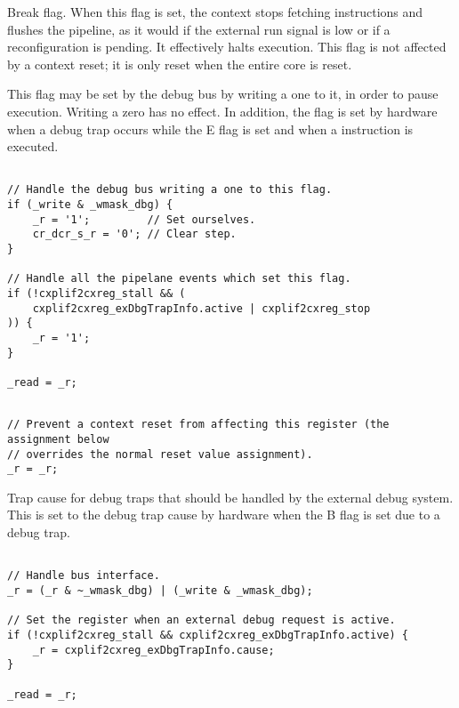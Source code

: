 Break flag. When this flag is set, the context stops fetching instructions and
flushes the pipeline, as it would if the external run signal is low or if a
reconfiguration is pending. It effectively halts execution. This flag is not 
affected by a context reset; it is only reset when the entire core is reset.

This flag may be set by the debug bus by writing a one to it, in order to pause
execution. Writing a zero has no effect. In addition, the flag is set by
hardware when a debug trap occurs while the E flag is set and when a 
instruction is executed.

\declaration{}
\implementation{}
\begin{lstlisting}

// Handle the debug bus writing a one to this flag.
if (_write & _wmask_dbg) {
    _r = '1';         // Set ourselves.
    cr_dcr_s_r = '0'; // Clear step.
}

// Handle all the pipelane events which set this flag.
if (!cxplif2cxreg_stall && (
    cxplif2cxreg_exDbgTrapInfo.active | cxplif2cxreg_stop
)) {
    _r = '1';
}

_read = _r;
\end{lstlisting}
\resetImplementation{}
\begin{lstlisting}

// Prevent a context reset from affecting this register (the assignment below
// overrides the normal reset value assignment).
_r = _r;

\end{lstlisting}

Trap cause for debug traps that should be handled by the external debug system.
This is set to the debug trap cause by hardware when the B flag is set due to a
debug trap.

\declaration{}
\implementation{}
\begin{lstlisting}

// Handle bus interface.
_r = (_r & ~_wmask_dbg) | (_write & _wmask_dbg);

// Set the register when an external debug request is active.
if (!cxplif2cxreg_stall && cxplif2cxreg_exDbgTrapInfo.active) {
    _r = cxplif2cxreg_exDbgTrapInfo.cause;
}

_read = _r;
\end{lstlisting}

